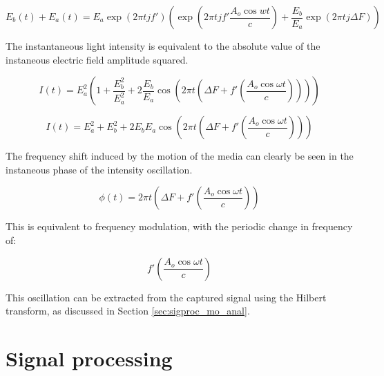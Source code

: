 \begin{dmath}
E_b(t) + E_a(t) = E_a \exp{(2 \pi t j f')}\left(\exp{\left(2 \pi t j f' \frac{ A_o \cos{wt}}{c}\right)} + \frac{E_b}{E_a} \exp{(2 \pi t j \Delta F)}\right)
\end{dmath}

The instantaneous light intensity is equivalent to the absolute value of the instaneous electric field amplitude squared.

\begin{dmath}
I(t) = E_a^2 \left(1 + \frac{E_b^2}{E_a^2} + 2 \frac{E_b}{E_a} \cos{\left(2 \pi t \left(\Delta F + f' \left( \frac{A_o \cos{\omega t}}{c} \right) \right)\right)} \right)
\end{dmath}

\begin{dmath}
I(t) = E_a^2 + E_b^2 + 2 E_b E_a \cos{\left(2 \pi t \left(\Delta F + f' \left( \frac{A_o \cos{\omega t}}{c} \right)  \right)\right)}
\end{dmath}

The frequency shift induced by the motion of the media can clearly be seen in the instaneous phase of the intensity oscillation.

\begin{dmath}
\label{eq:phase_aom_doppler}
\phi(t) = 2 \pi t \left(\Delta F + f' \left( \frac{A_o \cos{\omega t}}{c} \right)   \right)
\end{dmath}

This is equivalent to frequency modulation, with the periodic change in frequency of:

\begin{equation}
f' \left( \frac{A_o \cos{\omega t}}{c} \right)
\end{equation}

This oscillation can be extracted from the captured signal using the Hilbert transform, as discussed in Section \ref{sec:sigproc_mo_anal}.

\section{Signal processing}


